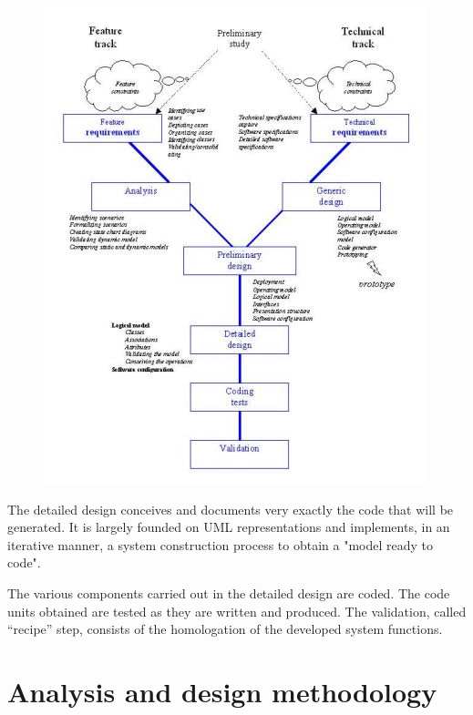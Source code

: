 \begin{figure}[h!]
	\centering
	\includegraphics[height=0.6\textheight]{fig01/2TUP}
	\label{fig:FilialesEtClients}
\end{figure}

The detailed design conceives and documents very exactly
the code that will be generated. It is largely founded on
UML representations and implements, in an iterative
manner, a system construction process to obtain a "model
ready to code".

The various components carried out in the detailed design
are coded. The code units obtained are tested as they are
written and produced. The validation, called “recipe” step,
consists of the homologation of the developed system
functions. 

\section{Analysis and design methodology }
\label{subsec:subsec01}

